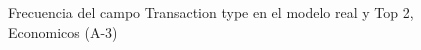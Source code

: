 \begin{figure}[H]
    \centering
    
    \caption{Frecuencia del campo Transaction type en el modelo real y Top 2, Economicos (A-3)}
    \label{frecuency-Transaction Type-top2}
\end{figure}